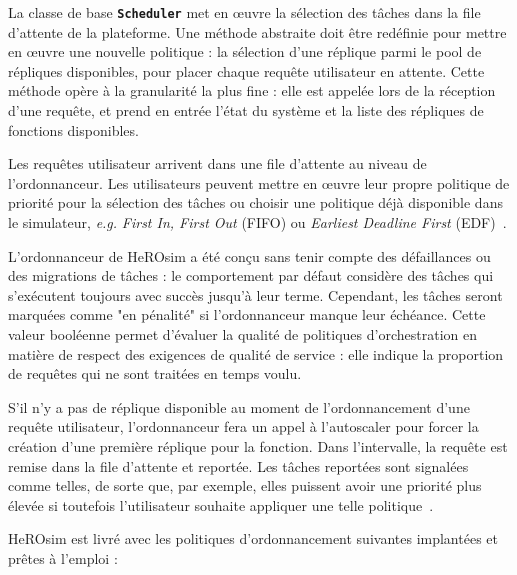 La classe de base \textbf{\texttt{Scheduler}} met en œuvre la sélection des tâches dans la file d'attente de la plateforme. Une méthode abstraite doit être redéfinie pour mettre en œuvre une nouvelle politique : la sélection d'une réplique parmi le pool de répliques disponibles, pour placer chaque requête utilisateur en attente. Cette méthode opère à la granularité la plus fine : elle est appelée lors de la réception d'une requête, et prend en entrée l'état du système et la liste des répliques de fonctions disponibles.

Les requêtes utilisateur arrivent dans une file d'attente au niveau de l'ordonnanceur. Les utilisateurs peuvent mettre en œuvre leur propre politique de priorité pour la sélection des tâches ou choisir une politique déjà disponible dans le simulateur, \textit{e.g.} \textit{First In, First Out} (\gls{FIFO}) ou \textit{Earliest Deadline First} (\gls{EDF})~\cite{herofake}.

L'ordonnanceur de HeROsim a été conçu sans tenir compte des défaillances ou des migrations de tâches : le comportement par défaut considère des tâches qui s'exécutent toujours avec succès jusqu'à leur terme. Cependant, les tâches seront marquées comme "en pénalité" si l'ordonnanceur manque leur échéance. Cette valeur booléenne permet d'évaluer la qualité de politiques d'orchestration en matière de respect des exigences de qualité de service : elle indique la proportion de requêtes qui ne sont traitées en temps voulu.

S'il n'y a pas de réplique disponible au moment de l'ordonnancement d'une requête utilisateur, l'ordonnanceur fera un appel à l'autoscaler pour forcer la création d'une première réplique pour la fonction. Dans l'intervalle, la requête est remise dans la file d'attente et reportée. Les tâches reportées sont signalées comme telles, de sorte que, par exemple, elles puissent avoir une priorité plus élevée si toutefois l'utilisateur souhaite appliquer une telle politique~\cite{herocache}.

HeROsim est livré avec les politiques d'ordonnancement suivantes implantées et prêtes à l'emploi :

